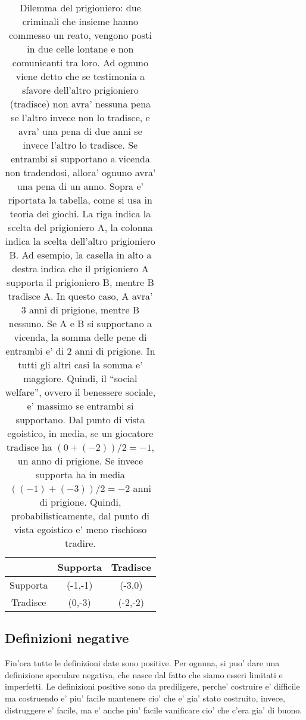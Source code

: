 \begin{center}
    \begin{table}
        \begin{tabular}{ |c|c|c| }
            \hline
            &  Supporta   &   Tradisce \\
            \hline
            Supporta   & (-1,-1) & (-3,0) \\
            \hline
            Tradisce & (0,-3) & (-2,-2) \\
            \hline
        \end{tabular}
        \caption{\label{tabPrisonerDilemma}Dilemma del prigioniero: due criminali che insieme hanno commesso un reato, vengono posti in due celle lontane e non comunicanti tra loro. Ad ognuno viene detto che se testimonia a sfavore dell'altro prigioniero (tradisce) non avra' nessuna pena se l'altro invece non lo tradisce, e avra' una pena di due anni se invece l'altro lo tradisce. Se entrambi si supportano a vicenda non tradendosi, allora' ognuno avra' una pena di un anno. Sopra e' riportata la tabella, come si usa in teoria dei giochi. La riga indica la scelta del prigioniero A, la colonna indica la scelta dell'altro prigioniero B. Ad esempio, la casella in alto a destra indica che il prigioniero A supporta il prigioniero B, mentre B tradisce A. In questo caso, A avra' 3 anni di prigione, mentre B nessuno. Se A e B si supportano a vicenda, la somma delle pene di entrambi e' di 2 anni di prigione. In tutti gli altri casi la somma e' maggiore. Quindi, il ``social welfare'', ovvero il benessere sociale, e' massimo se entrambi si supportano. Dal punto di vista egoistico, in media, se un giocatore tradisce ha $(0+(-2))/2 = -1$, un anno di prigione. Se invece supporta ha in media $((-1)+(-3))/2=-2$ anni di prigione. Quindi, probabilisticamente, dal punto di vista egoistico e' meno rischioso tradire. }

    \end{table}
\end{center}


\subsection{Definizioni negative}

Fin'ora tutte le definizioni date sono positive. Per ognuna, si puo' dare una definizione speculare negativa, che nasce dal fatto che siamo esseri limitati e imperfetti. Le definizioni positive sono da prediligere, perche' costruire e' difficile ma costruendo e' piu' facile mantenere cio' che e' gia' stato costruito, invece, distruggere e' facile, ma e' anche piu' facile vanificare cio' che c'era gia' di buono.\\

